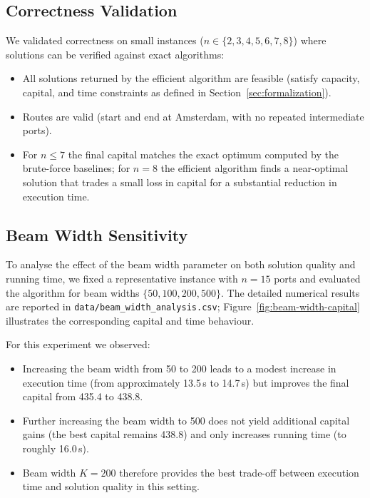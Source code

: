 \documentclass[12pt]{article}
\begin{document}
\subsection{Correctness Validation}

We validated correctness on small instances ($n \in \{2,3,4,5,6,7,8\}$) where solutions can be verified against exact algorithms:
\begin{itemize}
    \item All solutions returned by the efficient algorithm are feasible (satisfy capacity, capital, and time constraints as defined in Section~\ref{sec:formalization}).
    \item Routes are valid (start and end at Amsterdam, with no repeated intermediate ports).
    \item For $n \leq 7$ the final capital matches the exact optimum computed by the brute-force baselines; for $n = 8$ the efficient algorithm finds a near-optimal solution that trades a small loss in capital for a substantial reduction in execution time.
\end{itemize}

\subsection{Beam Width Sensitivity}

To analyse the effect of the beam width parameter on both solution quality and running time, we fixed a representative instance with $n=15$ ports and evaluated the algorithm for beam widths $\{50, 100, 200, 500\}$. The detailed numerical results are reported in \texttt{data/beam\_width\_analysis.csv}; Figure~\ref{fig:beam-width-capital} illustrates the corresponding capital and time behaviour.

For this experiment we observed:
\begin{itemize}
    \item Increasing the beam width from 50 to 200 leads to a modest increase in execution time (from approximately 13.5\,s to 14.7\,s) but improves the final capital from 435.4 to 438.8.
    \item Further increasing the beam width to 500 does not yield additional capital gains (the best capital remains 438.8) and only increases running time (to roughly 16.0\,s).
    \item Beam width $K = 200$ therefore provides the best trade-off between execution time and solution quality in this setting.
\end{itemize}
\end{document}
